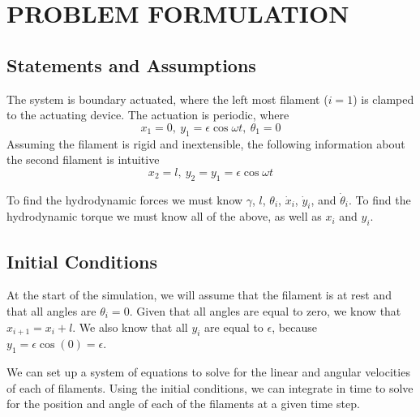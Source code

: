 \documentclass[12pt,letterpaper,titlepage]{article}
\begin{document}
\maketitle
\section{PROBLEM FORMULATION}
\subsection{Statements and Assumptions}
The system is boundary actuated, where the left most filament ($i=1$) is clamped to the actuating device. The actuation is periodic, where
\begin{equation}
x_1 = 0, \ y_1 = \epsilon \cos \omega t, \ \theta_1 = 0
\end{equation}
Assuming the filament is rigid and inextensible, the following information about the second filament is intuitive
\begin{equation} \label{eqn:ClampFilamentTwo}
x_2 = l, \ y_2 = y_1 = \epsilon \cos \omega t
\end{equation}

To find the hydrodynamic forces we must know $\gamma$, $l$, $\theta_i$, $\dot{x}_i$, $\dot{y}_i$, and $\dot{\theta}_i$. To find the hydrodynamic torque we must know all of the above, as well as $x_i$ and $y_i$.

\subsection{Initial Conditions}
At the start of the simulation, we will assume that the filament is at rest and that all angles are $\theta_i = 0$. Given that all angles are equal to zero, we know that $x_{i+1} = x_{i} + l$. We also know that all $y_i$ are equal to $\epsilon$, because $y_1 = \epsilon \cos (0) = \epsilon$.

We can set up a system of equations to solve for the linear and angular velocities of each of filaments. Using the initial conditions, we can integrate in time to solve for the position and angle of each of the filaments at a given time step.
\end{document}

